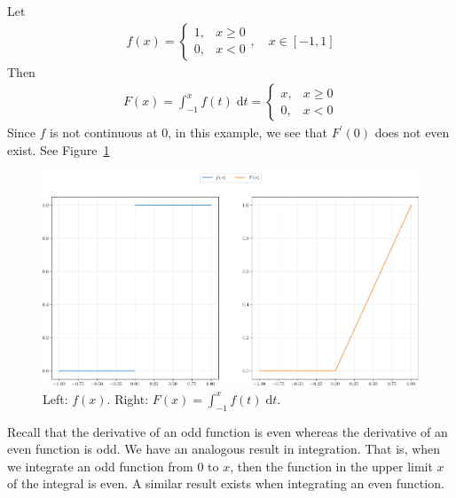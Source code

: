 \documentclass[thmcnt=section, 12pt]{my-elegantbook}
\begin{document}
\begin{example} \label{eg:12}
    Let
    \begin{align*}
        f(x) = \begin{cases}
                   1,
                    & x \geq 0 \\
                   0,
                    & x < 0
               \end{cases},
        \quad x \in [-1, 1]
    \end{align*}
    Then
    \begin{align*}
        F(x)
        = \int_{-1}^x f(t) \; \mathrm{d} t
        = \begin{cases}
              x,
               & x \geq 0 \\
              0,
               & x < 0
          \end{cases}
    \end{align*}
    Since $f$ is not continuous at $0$, in this example,
    we see that $F^\prime(0)$ does not even exist.
    See Figure~\ref{fig:15}
    \begin{figure}[ht]
        \centering
        \includegraphics[scale=0.5]{figures/ma-015.png}
        \caption{Left: $f(x)$. Right: $F(x) = \int_{-1}^x f(t) \; \mathrm{d} t$.}
        \label{fig:15}
    \end{figure}
\end{example}


Recall that the derivative of an odd function is even
whereas the derivative of an even function is odd.
We have an analogous result in integration.
That is, when we integrate an odd function
from $0$ to $x$, then the function in the upper limit $x$
of the integral is even.
A similar result exists when integrating an even function.
\end{document}
